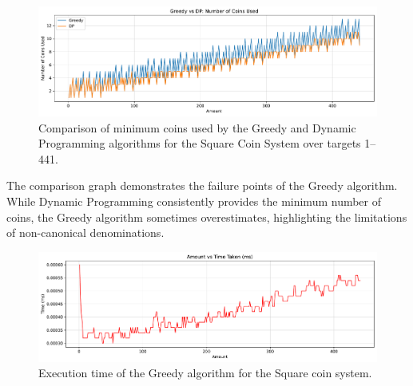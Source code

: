 \documentclass[12pt,a4paper]{report}
\begin{document}
\begin{itemize}
    \begin{figure}[H]
      \centering
      \includegraphics[width=\textwidth]{graphs/compare_coins_square_plot.pdf}
      \caption{Comparison of minimum coins used by the Greedy and Dynamic Programming algorithms for the Square Coin System over targets 1--441.}
      \label{fig:compare_coins_square_plot}
    \end{figure}

    The comparison graph demonstrates the failure points of the Greedy algorithm. While Dynamic Programming consistently provides the minimum number of coins, the Greedy algorithm sometimes overestimates, highlighting the limitations of non-canonical denominations.

    \begin{figure}[H]
      \centering
      \includegraphics[width=\textwidth]{graphs/greedy_time_square_plot.pdf}
      \caption{Execution time of the Greedy algorithm for the Square coin system.}
      \label{fig:greedy_time_square_plot}
    \end{figure}


\end{itemize}
\end{document}
